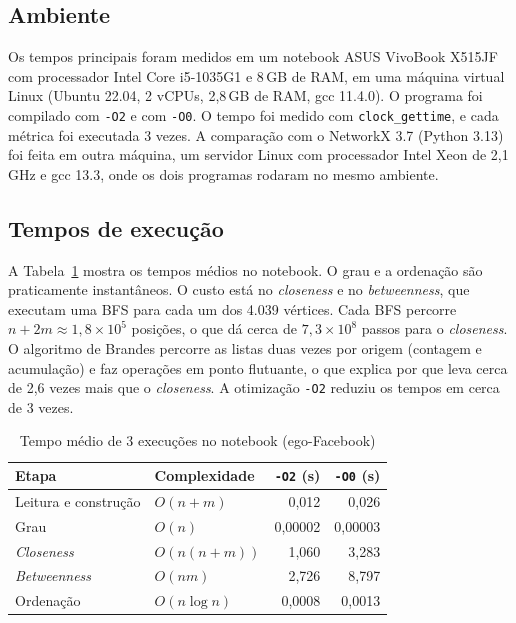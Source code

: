 \documentclass[conference]{IEEEtran}
\begin{document}
\subsection{Ambiente}

Os tempos principais foram medidos em um notebook ASUS VivoBook X515JF com processador Intel Core i5-1035G1 e 8\,GB de RAM, em uma máquina virtual Linux (Ubuntu 22.04, 2 vCPUs, 2,8\,GB de RAM, gcc 11.4.0). O programa foi compilado com \texttt{-O2} e com \texttt{-O0}. O tempo foi medido com \texttt{clock\_\allowbreak gettime}, e cada métrica foi executada 3 vezes. A comparação com o NetworkX 3.7 (Python 3.13) foi feita em outra máquina, um servidor Linux com processador Intel Xeon de 2,1\,GHz e gcc 13.3, onde os dois programas rodaram no mesmo ambiente.

\subsection{Tempos de execução}

A Tabela~\ref{tab:tempos} mostra os tempos médios no notebook. O grau e a ordenação são praticamente instantâneos. O custo está no \textit{closeness} e no \textit{betweenness}, que executam uma BFS para cada um dos 4.039 vértices. Cada BFS percorre $n + 2m \approx 1{,}8\times10^5$ posições, o que dá cerca de $7{,}3\times10^8$ passos para o \textit{closeness}. O algoritmo de Brandes percorre as listas duas vezes por origem (contagem e acumulação) e faz operações em ponto flutuante, o que explica por que leva cerca de 2,6 vezes mais que o \textit{closeness}. A otimização \texttt{-O2} reduziu os tempos em cerca de 3 vezes.

\begin{table}[htbp]
\caption{Tempo médio de 3 execuções no notebook (ego-Facebook)}
\label{tab:tempos}
\centering
\begin{tabular}{llrr}
\toprule
Etapa & Complexidade & \texttt{-O2} (s) & \texttt{-O0} (s) \\
\midrule
Leitura e construção & $O(n+m)$ & 0,012 & 0,026 \\
Grau & $O(n)$ & 0,00002 & 0,00003 \\
\textit{Closeness} & $O(n(n+m))$ & 1,060 & 3,283 \\
\textit{Betweenness} & $O(nm)$ & 2,726 & 8,797 \\
Ordenação & $O(n\log n)$ & 0,0008 & 0,0013 \\
\bottomrule
\end{tabular}
\end{table}
\end{document}
